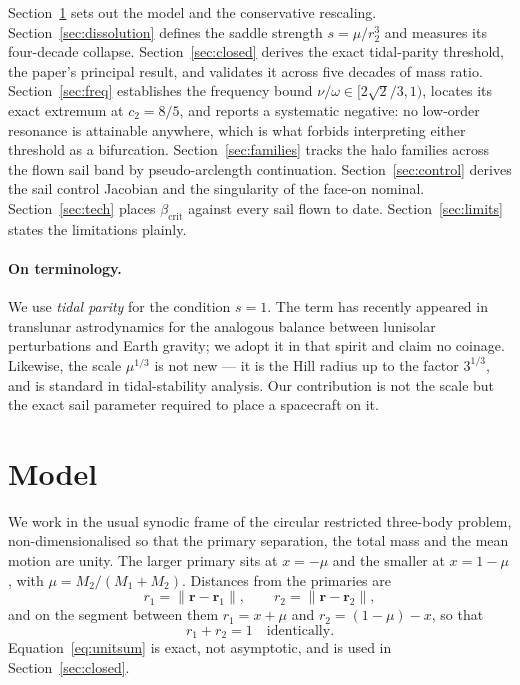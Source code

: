 \documentclass[11pt,a4paper]{article}
\begin{document}
Section~\ref{sec:model} sets out the model and the conservative rescaling.
Section~\ref{sec:dissolution} defines the saddle strength $s=\mu/r_2^3$ and
measures its four-decade collapse. Section~\ref{sec:closed} derives the exact
tidal-parity threshold, the paper's principal result, and validates it across
five decades of mass ratio. Section~\ref{sec:freq} establishes the frequency
bound $\nu/\omega\in[2\sqrt2/3,1)$, locates its exact extremum at $c_2=8/5$, and
reports a systematic negative: no low-order resonance is attainable anywhere,
which is what forbids interpreting either threshold as a bifurcation.
Section~\ref{sec:families} tracks the halo families across the flown sail band
by pseudo-arclength continuation. Section~\ref{sec:control} derives the sail
control Jacobian and the singularity of the face-on nominal.
Section~\ref{sec:tech} places $\beta_{\mathrm{crit}}$ against every sail flown
to date. Section~\ref{sec:limits} states the limitations plainly.

\paragraph{On terminology.}
We use \emph{tidal parity} for the condition $s=1$. The term has recently
appeared in translunar astrodynamics for the analogous balance between
lunisolar perturbations and Earth gravity; we adopt it in that spirit and claim
no coinage. Likewise, the scale $\mu^{1/3}$ is not new --- it is the Hill radius
up to the factor $3^{1/3}$, and is standard in tidal-stability analysis. Our
contribution is not the scale but the exact sail parameter required to place a
spacecraft on it.

\section{Model}\label{sec:model}

We work in the usual synodic frame of the circular restricted three-body
problem, non-dimensionalised so that the primary separation, the total mass and
the mean motion are unity. The larger primary sits at $x=-\mu$ and the smaller
at $x=1-\mu$, with $\mu=M_2/(M_1+M_2)$. Distances from the primaries are
\begin{equation}
  r_1 = \lVert\bm{r}-\bm{r}_1\rVert, \qquad
  r_2 = \lVert\bm{r}-\bm{r}_2\rVert ,
\end{equation}
and on the segment between them $r_1=x+\mu$ and $r_2=(1-\mu)-x$, so that
\begin{equation}
  r_1 + r_2 = 1 \quad\text{identically.}
  \label{eq:unitsum}
\end{equation}
Equation~\eqref{eq:unitsum} is exact, not asymptotic, and is used in
Section~\ref{sec:closed}.
\end{document}
